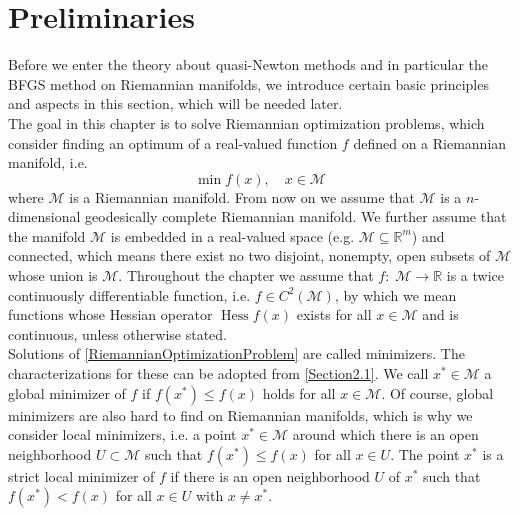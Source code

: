 \section{Preliminaries}
\label{Section4.1}

Before we enter the theory about quasi-Newton methods and in particular the BFGS method on Riemannian manifolds, we introduce certain basic principles and aspects in this section, which will be needed later. \\

The goal in this chapter is to solve Riemannian optimization problems, which consider finding an optimum of a real-valued function $f$ defined on a Riemannian manifold, i.e.
\begin{equation}\label{RiemannianOptimizationProblem}
    \min f(x), \quad x \in \mathcal{M}
\end{equation}
where $\mathcal{M}$ is a Riemannian manifold. From now on we assume that $\mathcal{M}$ is a $n$-dimensional geodesically complete Riemannian manifold. We further assume that the manifold $\mathcal{M}$ is embedded in a real-valued space (e.g. $\mathcal{M} \subseteq \mathbb{R}^m$) and connected, which means there exist no two disjoint, nonempty, open subsets of $\mathcal{M}$ whose union is $\mathcal{M}$. Throughout the chapter we assume that $f \colon \; \mathcal{M} \to \mathbb{R}$ is a twice continuously differentiable function, i.e. $f \in C^2(\mathcal{M})$, by which we mean functions whose Hessian operator $\operatorname{Hess} f(x)$ exists for all $x \in \mathcal{M}$ and is continuous, unless otherwise stated. \\
Solutions of \cref{RiemannianOptimizationProblem} are called minimizers. The characterizations for these can be adopted from \cref{Section2.1}. We call $x^* \in \mathcal{M}$ a global minimizer of $f$ if $f(x^*) \leq f(x)$  holds for all $x \in \mathcal{M}$. Of course, global minimizers are also hard to find on Riemannian manifolds, which is why we consider local minimizers, i.e. a point $x^* \in \mathcal{M}$ around which there is an open neighborhood $U \subset \mathcal{M}$ such that $f(x^*) \leq f(x)$ for all $x \in U$. The point $x^*$ is a strict local minimizer of $f$ if there is an open neighborhood $U$ of $x^*$ such that $f(x^*) < f(x)$ for all $x \in U$ with $x \neq x^*$. \\

